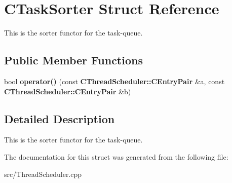 \section{CTaskSorter Struct Reference}
\label{structCTaskSorter}


This is the sorter functor for the task-\/queue.  
\subsection*{Public Member Functions}
\begin{DoxyCompactItemize}
\item 
bool {\bfseries operator()} (const {\bf CThreadScheduler::CEntryPair} \&a, const {\bf CThreadScheduler::CEntryPair} \&b)\label{structCTaskSorter_a6053d39c8f3498f6c3a89956342a5135}

\end{DoxyCompactItemize}


\subsection{Detailed Description}
This is the sorter functor for the task-\/queue. 

The documentation for this struct was generated from the following file:\begin{DoxyCompactItemize}
\item 
src/ThreadScheduler.cpp\end{DoxyCompactItemize}
